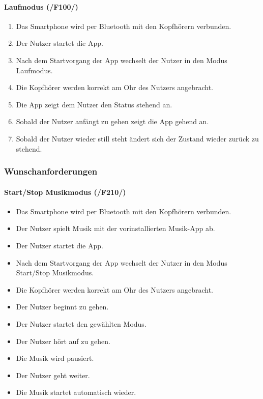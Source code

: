 \documentclass[a4paper,12pt]{article}
\begin{document}
  \paragraph{Laufmodus (/F100/)}
  \begin{enumerate}
    \item Das Smartphone wird per Bluetooth mit den Kopfhörern verbunden.
    \item Der Nutzer startet die App.
    \item Nach dem Startvorgang der App wechselt der Nutzer in den Modus \glqq Laufmodus\grqq .
    \item Die Kopfhörer werden korrekt am Ohr des Nutzers angebracht.
    \item Die App zeigt dem Nutzer den Status \glqq stehend\grqq{} an.
    \item Sobald der Nutzer anfängt zu gehen zeigt die App \glqq gehend\grqq{} an.
    \item Sobald der Nutzer wieder still steht ändert sich der Zustand wieder zurück zu \glqq stehend\grqq. 
  \end{enumerate}

  \subsubsection{Wunschanforderungen}
  \paragraph{Start/Stop Musikmodus (/F210/)}
  \begin{itemize}
    \item[] Das Smartphone wird per Bluetooth mit den Kopfhörern verbunden.
    \item[] Der Nutzer spielt Musik mit der vorinstallierten Musik-App ab.
    \item[] Der Nutzer startet die App.
    \item[] Nach dem Startvorgang der App wechselt der Nutzer in den Modus \glqq Start/Stop Musikmodus\grqq .
    \item[] Die Kopfhörer werden korrekt am Ohr des Nutzers angebracht.
    \item[] Der Nutzer beginnt zu gehen.
    \item[] Der Nutzer startet den gewählten Modus.
    \item[] Der Nutzer hört auf zu gehen.
    \item[] Die Musik wird pausiert.
    \item[] Der Nutzer geht weiter.
    \item[] Die Musik startet automatisch wieder.
  \end{itemize}
  
\end{document}
